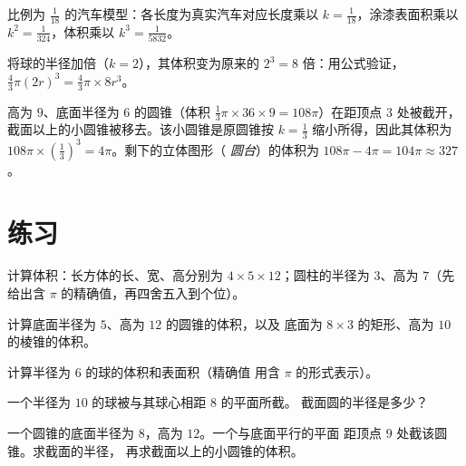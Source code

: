 \begin{example}\label{ex:g9:solids:scaling}
比例为 $\frac{1}{18}$ 的汽车模型：各长度为真实汽车对应长度乘以
$k = \frac{1}{18}$，涂漆表面积乘以
$k^2 = \frac{1}{324}$，体积乘以 $k^3 = \frac{1}{5832}$。

将球的半径加倍（$k = 2$），其体积变为原来的
$2^3 = 8$ 倍：用公式验证，
$\frac43\pi (2r)^3 = \frac43 \pi \times 8r^3$。
\end{example}

\begin{example}[圆台]\label{ex:g9:solids:truncated}
高为 $9$、底面半径为 $6$ 的圆锥（体积
$\frac13 \pi \times 36 \times 9 = 108\pi$）在距顶点 $3$ 处被截开，
截面以上的小圆锥被移去。该小圆锥是原圆锥按
$k = \frac13$ 缩小所得，因此其体积为
$108\pi \times \left(\frac13\right)^3 = 4\pi$。剩下的立体图形（
\emph{圆台}）的体积为 $108\pi - 4\pi = 104\pi \approx 327$。
\end{example}

\section{练习}

\begin{exercise}[$\star$]\label{exo:g9:solids:1}
计算体积：长方体的长、宽、高分别为 $4 \times 5
\times 12$；圆柱的半径为 $3$、高为 $7$（先给出含
$\pi$ 的精确值，再四舍五入到个位）。
\end{exercise}

\begin{exercise}[$\star$]\label{exo:g9:solids:2}
计算底面半径为 $5$、高为 $12$ 的圆锥的体积，以及
底面为 $8 \times 3$ 的矩形、高为 $10$ 的棱锥的体积。
\end{exercise}

\begin{exercise}[$\star$]\label{exo:g9:solids:3}
计算半径为 $6$ 的球的体积和表面积（精确值
用含 $\pi$ 的形式表示）。
\end{exercise}

\begin{exercise}[$\star$]\label{exo:g9:solids:4}
一个半径为 $10$ 的球被与其球心相距 $8$ 的平面所截。
截面圆的半径是多少？
\end{exercise}

\begin{exercise}[$\star\star$]\label{exo:g9:solids:5}
一个圆锥的底面半径为 $8$，高为 $12$。一个与底面平行的平面
距顶点 $9$ 处截该圆锥。求截面的半径，
再求截面以上的小圆锥的体积。
\end{exercise}

